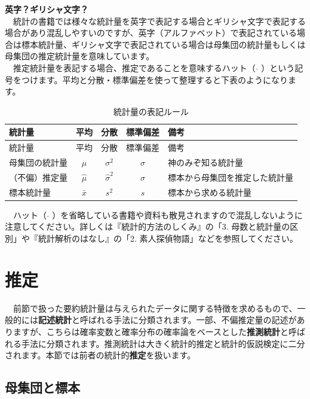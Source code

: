 \documentclass[
  12pt,
]{book}
\makeatletter
\newenvironment{kframe}{%
\medskip{}
\setlength{\fboxsep}{.8em}
 \def\at@end@of@kframe{}%
 \ifinner\ifhmode%
  \def\at@end@of@kframe{\end{minipage}}%
  \begin{minipage}{\columnwidth}%
 \fi\fi%
 \def\FrameCommand##1{\hskip\@totalleftmargin \hskip-\fboxsep
 \colorbox{shadecolor}{##1}\hskip-\fboxsep
     \hskip-\linewidth \hskip-\@totalleftmargin \hskip\columnwidth}%
 \MakeFramed {\advance\hsize-\width
   \@totalleftmargin\z@ \linewidth\hsize
   \@setminipage}}%
 {\par\unskip\endMakeFramed%
 \at@end@of@kframe}
\newenvironment{rmdblock}[1]
  {
  \begin{itemize}
  \renewcommand{\labelitemi}{
    \raisebox{-.7\height}[0pt][0pt]{
      {\setkeys{Gin}{width=3em,keepaspectratio}}
    }
  }
  \setlength{\fboxsep}{1em}
  \begin{kframe}
  \item
  }
  {
  \end{kframe}
  \end{itemize}
  }
\newenvironment{rmdnote}
  {\begin{rmdblock}{note}}
  {\end{rmdblock}}
\makeatother
\begin{document}
\begin{rmdnote}
\textbf{英字？ギリシャ文字？}\\
　統計の書籍では様々な統計量を英字で表記する場合とギリシャ文字で表記する場合があり混乱しやすいのですが、英字（アルファベット）で表記されている場合は標本統計量、ギリシャ文字で表記されている場合は母集団の統計量もしくは母集団の推定統計量を意味しています。\\
　推定統計量を表記する場合、推定であることを意味するハット（ \(\hat{}\) ）という記号をつけます。平均と分散・標準偏差を使って整理すると下表のようになります。

\begin{longtable}[]{@{}lcccl@{}}
\caption{統計量の表記ルール}\tabularnewline
\toprule
統計量 & 平均 & 分散 & 標準偏差 & 備考 \\
\midrule
\endfirsthead
\toprule
統計量 & 平均 & 分散 & 標準偏差 & 備考 \\
\midrule
\endhead
母集団の統計量 & \(\mu\) & \(\sigma^2\) & \(\sigma\) & 神のみぞ知る統計量 \\
（不偏）推定量 & \(\hat{\mu}\) & \(\hat{\sigma}^2\) & \(\hat{\sigma}\) & 標本から母集団を推定した統計量 \\
標本統計量 & \(\bar{x}\) & \(s^2\) & \(s\) & 標本から求める統計量 \\
\bottomrule
\end{longtable}
　ハット（ \(\hat{}\) ）を省略している書籍や資料も散見されますので混乱しないように注意してください。詳しくは『統計的方法のしくみ』\citep{ToukeitekiHouhounoSikumi:jbook}の「3. 母数と統計量の区別」や『統計解析のはなし』\citep{ToukeiKaisekinoHanashi}の「2. 素人探偵物語」などを参照してください。 \end{rmdnote}

\newpage

\hypertarget{ux63a8ux5b9a}{%
\section{推定}\label{ux63a8ux5b9a}}

　前節で扱った要約統計量は与えられたデータに関する特徴を求めるもので、一般的には\textbf{記述統計}と呼ばれる手法に分類されます。一部、不偏推定量の記述がありますが、こちらは確率変数と確率分布の確率論をベースとした\textbf{推測統計}と呼ばれる手法に分類されます。推測統計は大きく統計的推定と統計的仮説検定に二分されます。本節では前者の統計的\textbf{推定}を扱います。

\hypertarget{ux6bcdux96c6ux56e3ux3068ux6a19ux672c}{%
\subsection{母集団と標本}\label{ux6bcdux96c6ux56e3ux3068ux6a19ux672c}}
\end{document}
